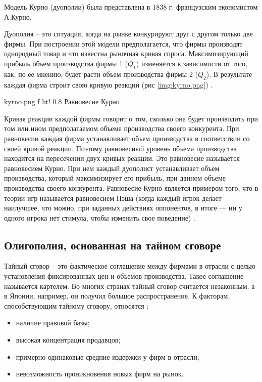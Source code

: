 Модель Курно (дуополии) была представлена в 1838 г. французским экономистом А.Курно. 

Дуополия -- это ситуация, когда на рынке конкурируют друг с другом только две фирмы. При
построении этой модели предполагается, что фирмы производят однородный товар и что известна рыночная кривая спроса. Максимизирующий прибыль объем производства фирмы 1 ($Q_1$) изменяется в зависимости от того, как, по ее мнению, будет расти объем производства фирмы 2 ($Q_2$). В результате каждая фирма строит свою кривую реакции (рис \ref{img:kyrno.png}) \cite{info_oly3}.

{kyrno.png}
{f}
{ht!}
{0.8\textwidth}
{Равновесие Курно}

Кривая реакции каждой фирмы говорит о том, сколько она будет производить при том или ином предполагаемом объеме производства своего конкурента. 
При равновесии каждая фирма устанавливает объем производства в соответствии со своей кривой реакции. 
Поэтому равновесный уровень объема производства находится на пересечении двух кривых реакции. 
Это равновесие называется равновесием Курно. 
При нем каждый дуополист устанавливает объем производства, который максимизирует его прибыль, при данном объеме производства своего конкурента. 
Равновесие Курно является примером того, что в теории игр называется равновесием Нэша (когда каждый игрок делает наилучшее, что можно, при заданных действиях оппонентов, в итоге — ни у одного игрока нет стимула, чтобы изменить свое поведение) \cite{info_oly3}.

\subsection{Олигополия, основанная на тайном сговоре}

Тайный сговор -- это фактическое соглашение между фирмами в отрасли с целью установления фиксированных цен и объемов производства. 
Такое соглашение называется картелем.
Во многих странах тайный сговор считается незаконным, а в Японии, например, он получил
большое распространение. 
К факторам, способствующим тайному сговору, относятся \cite{info_oly3}: 

\begin{itemize}
	\item наличие правовой базы;
	\item высокая концентрация продавцов;
	\item примерно одинаковые средние издержки у фирм в отрасли;
	\item невозможность проникновения новых фирм на рынок.
\end{itemize}


